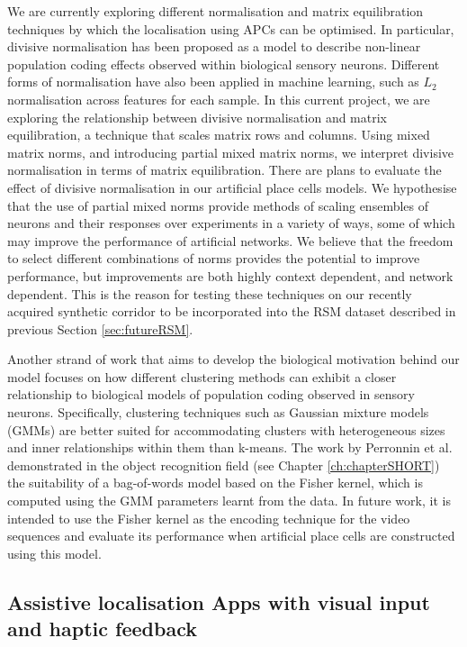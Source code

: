 We are currently exploring different normalisation and matrix equilibration techniques by which the localisation using APCs can be optimised. In particular, divisive normalisation has been proposed as a model to describe non-linear population coding effects observed within biological sensory neurons. Different forms of normalisation have also been applied in machine learning, such as $L_2$ normalisation across features for each sample. In this current project, we are exploring the relationship between divisive normalisation and matrix equilibration, a technique that scales matrix rows and columns. Using mixed matrix norms, and introducing partial mixed matrix norms, we interpret divisive normalisation in terms of matrix equilibration. There are plans to evaluate the effect of divisive normalisation in our artificial place cells models. We hypothesise that the use of partial mixed norms provide methods of scaling ensembles of neurons and their responses over experiments in a variety of ways, some of which may improve the performance of artificial networks. We believe that the freedom to select different combinations of norms provides the potential to improve performance, but improvements are both highly context dependent, and network dependent. This is the reason for testing these techniques on our recently acquired synthetic corridor to be incorporated into the RSM dataset described in previous Section \ref{sec:futureRSM}.


Another strand of work that aims to develop the biological motivation behind our model focuses on how different clustering methods can exhibit a closer relationship to biological models of population coding observed in sensory neurons. Specifically, clustering techniques such as Gaussian mixture models (GMMs) are better suited for accommodating clusters with heterogeneous sizes and inner relationships within them than k-means. The work by Perronnin et al. \cite{ perronnin2007fisher, Perronnin2010, Jegou2012} demonstrated in the object recognition field (see Chapter \ref{ch:chapterSHORT}) the suitability of a bag-of-words model based on the Fisher kernel, which is computed using the GMM parameters learnt from the data. In future work, it is intended to use the Fisher kernel as the encoding technique for the video sequences and evaluate its performance when artificial place cells are constructed using this model.

\subsection{Assistive localisation Apps with visual input and haptic feedback}

